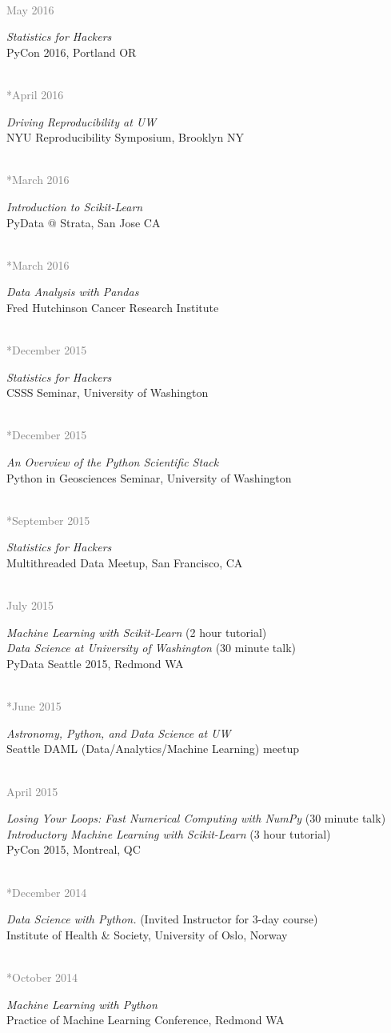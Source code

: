 \documentclass{article} %
\newlength\sidebarwidth
\newcommand{\dateonly}[2][]
	 {\begin{minipage}{\textwidth}
	 \vspace*{.4\baselineskip}
         \nopagebreak\hspace{0in}%
         \nopagebreak\begin{minipage}[t]{\sidebarwidth - .2cm}
         \raggedleft {~}
         {\\[-\baselineskip] \textcolor{gray}{\footnotesize #1}}
	 \end{minipage}%
	 \hfill
	 \begin{minipage}[t]{\linewidth - \sidebarwidth}
	 #2%
	 \end{minipage}%
	 \vspace*{.2\baselineskip plus 1\baselineskip minus
	 .2\baselineskip}%
	 \end{minipage}}
\begin{document}
  \dateonly[May 2016]{
      {\it Statistics for Hackers}\\
      PyCon 2016, Portland OR
  }

  \dateonly[**April 2016]{
      {\it Driving Reproducibility at UW}\\
      NYU Reproducibility Symposium, Brooklyn NY
  }

  \dateonly[**March 2016]{
      {\it Introduction to Scikit-Learn}\\
      PyData @ Strata, San Jose CA
  }

  \dateonly[**March 2016]{
      {\it Data Analysis with Pandas}\\
      Fred Hutchinson Cancer Research Institute
  }

  \dateonly[**December 2015]{
      {\it Statistics for Hackers}\\
      CSSS Seminar, University of Washington
  }

  \dateonly[**December 2015]{
      {\it An Overview of the Python Scientific Stack}\\
      Python in Geosciences Seminar, University of Washington
  }

  \dateonly[**September 2015]{
      {\it Statistics for Hackers}\\
      Multithreaded Data Meetup, San Francisco, CA
  }

  \dateonly[July 2015]{
    {\it Machine Learning with Scikit-Learn} (2 hour tutorial)\\
    {\it Data Science at University of Washington} (30 minute talk)\\
    PyData Seattle 2015, Redmond WA
  }

  \dateonly[**June 2015]{
    {\it Astronomy, Python, and Data Science at UW}\\
    Seattle DAML (Data/Analytics/Machine Learning) meetup
  }

  \dateonly[April 2015]{
    {\it Losing Your Loops: Fast Numerical Computing with NumPy} (30 minute talk)\\
    {\it Introductory Machine Learning with Scikit-Learn} (3 hour tutorial)\\
    PyCon 2015, Montreal, QC
  }

  \dateonly[**December 2014]{
    {\it Data Science with Python.} (Invited Instructor for 3-day course)\\
    Institute of Health \& Society, University of Oslo, Norway
  }

  \dateonly[**October 2014]{
    {\it Machine Learning with Python}\\
    Practice of Machine Learning Conference, Redmond WA
  }
\end{document}
